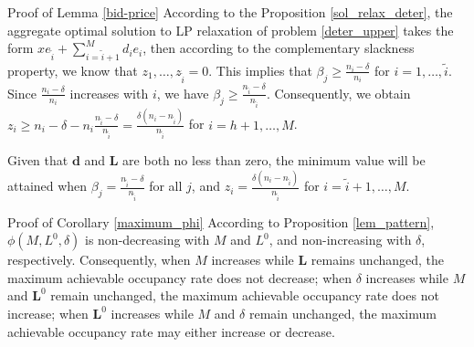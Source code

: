 \begin{pf}{Proof of Lemma \ref{bid-price}}
According to the Proposition \ref{sol_relax_deter}, the aggregate optimal solution to LP relaxation of problem \eqref{deter_upper} takes the form $x e_{\tilde{i}} + \sum_{i=\tilde{i}+1} ^{M} d_{i} e_{i}$, then according to the complementary slackness property, we know that $z_1, \ldots, z_{\tilde{i}} = 0$. This implies that $\beta_j \geq \frac{n_i - \delta}{n_i}$ for $i = 1,\ldots, \tilde{i}$. Since $\frac{n_i - \delta}{n_i}$ increases with $i$, we have $\beta_j \geq \frac{n_{\tilde{i}} - \delta}{n_{\tilde{i}}}$. Consequently, we obtain $z_{i} \geq n_i - \delta - n_i \frac{n_{\tilde{i}} - \delta}{n_{\tilde{i}}} = \frac{\delta(n_i-n_{\tilde{i}})}{n_{\tilde{i}}}$ for $i = h+1, \ldots, M$.
  
Given that $\mathbf{d}$ and $\mathbf{L}$ are both no less than zero, the minimum value will be attained when $\beta_j = \frac{n_{\tilde{i}} - \delta}{n_{\tilde{i}}}$ for all $j$, and $z_i = \frac{\delta(n_i-n_{\tilde{i}})}{n_{\tilde{i}}}$ for $i = \tilde{i}+1, \ldots, M$.  
\end{pf}

\begin{pf}{Proof of Corollary \ref{maximum_phi}}
According to Proposition \ref{lem_pattern}, $\phi(M, L^{0}, \delta)$ is non-decreasing with $M$ and  $L^{0}$, and non-increasing with $\delta$, respectively. Consequently, when $M$ increases while $\bm{L}$ remains unchanged, the maximum achievable occupancy rate does not decrease; when $\delta$ increases while $M$ and $\bm{L}^{0}$ remain unchanged, the maximum achievable occupancy rate does not increase; when $\bm{L}^{0}$ increases while $M$ and $\delta$ remain unchanged, the maximum achievable occupancy rate may either increase or decrease.

\end{pf}

\newpage
